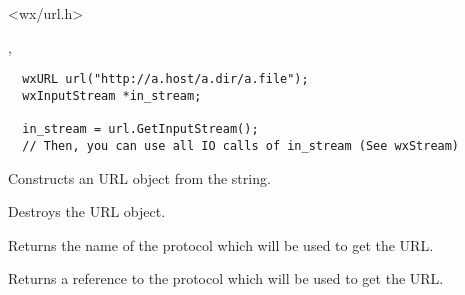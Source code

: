 \section{}\label{wxurl}




<wx/url.h>


, 


\begin{verbatim}
  wxURL url("http://a.host/a.dir/a.file");
  wxInputStream *in_stream;

  in_stream = url.GetInputStream();
  // Then, you can use all IO calls of in_stream (See wxStream)
\end{verbatim}



\label{wxurlconstr}


Constructs an URL object from the string.





Destroys the URL object.

%
%


Returns the name of the protocol which will be used to get the URL.

%
%


Returns a reference to the protocol which will be used to get the URL.

%
%

